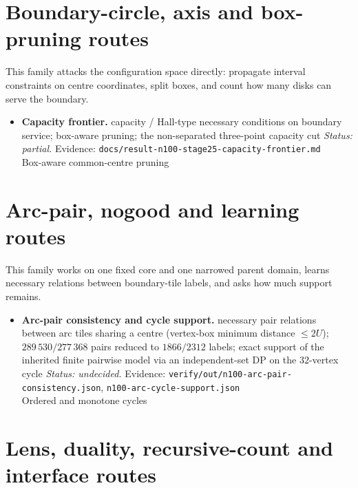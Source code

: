 \section{Boundary-circle, axis and box-pruning routes}

This family attacks the configuration space directly: propagate interval constraints on centre
coordinates, split boxes, and count how many disks can serve the boundary.

\begin{itemize}[leftmargin=1.2em,itemsep=3pt]
\item \textbf{Capacity frontier.} capacity / Hall-type necessary conditions on boundary service; box-aware
pruning; the non-separated three-point capacity cut \emph{Status: partial.} Evidence: {\footnotesize\texttt{docs/\allowbreak{}result-\allowbreak{}n100-\allowbreak{}stage25-\allowbreak{}capacity-\allowbreak{}frontier.md}} \\
Box-aware common-centre pruning
\end{itemize}


\section{Arc-pair, nogood and learning routes}

This family works on one fixed core and one narrowed parent domain, learns necessary relations
between boundary-tile labels, and asks how much support remains.

\begin{itemize}[leftmargin=1.2em,itemsep=3pt]
\item \textbf{Arc-pair consistency and cycle support.} necessary pair relations between arc tiles sharing a centre
(vertex-box minimum distance $\le2U$); $289\,530/277\,368$ pairs reduced to $1866/2312$ labels;
exact support of the inherited finite pairwise model via an independent-set DP on the $32$-vertex
cycle \emph{Status: undecided.} Evidence: \texttt{verify/\allowbreak{}out/\allowbreak{}n100-\allowbreak{}arc-\allowbreak{}pair-\allowbreak{}consistency.json},
\texttt{n100-\allowbreak{}arc-\allowbreak{}cycle-\allowbreak{}support.json} \\
Ordered and monotone cycles
\end{itemize}


\section{Lens, duality, recursive-count and interface routes}

